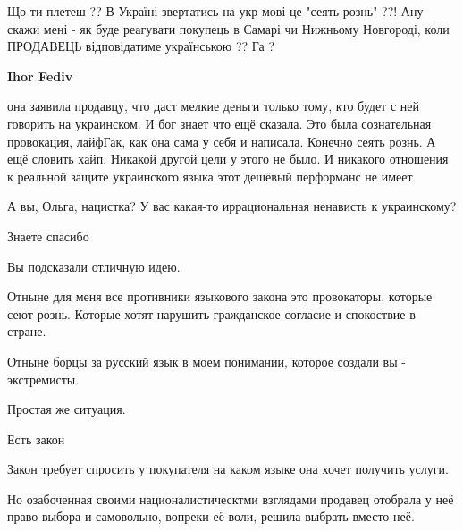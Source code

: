 \begin{itemize}
\begin{itemize}
 

Що ти плетеш ?? В Україні звертатись на укр мові це "сеять рознь" ??! Ану скажи
мені - як буде реагувати покупець в Самарі чи Нижньому Новгороді, коли
ПРОДАВЕЦЬ відповідатиме українською ?? Га ?

 
\textbf{Ihor Fediv} 

она заявила продавцу, что даст мелкие деньги только тому, кто будет с ней
говорить на украинском. И бог знает что ещё сказала. Это была сознательная
провокация, лайфГак, как она сама у себя и написала. Конечно сеять рознь. А ещё
словить хайп. Никакой другой цели у этого не было. И никакого отношения к
реальной защите украинского языка этот дешёвый перформанс не имеет


 
А вы, Ольга, нацистка? У вас какая-то иррациональная ненависть к украинскому?


Знаете спасибо

Вы подсказали отличную идею.

Отныне для меня все противники языкового закона это провокаторы, которые сеют
рознь. Которые хотят нарушить гражданское согласие и спокоствие в стране.

Отныне борцы за русский язык в моем понимании, которое создали вы -
экстремисты.

Простая же ситуация.

Есть закон

Закон требует спросить у покупателя на каком языке она хочет получить услуги.

Но озабоченная своими националистическтми взглядами продавец отобрала у неё
право выбора и самовольно, вопреки её воли, решила выбрать вместо неё.


\end{itemize}
\end{itemize}
